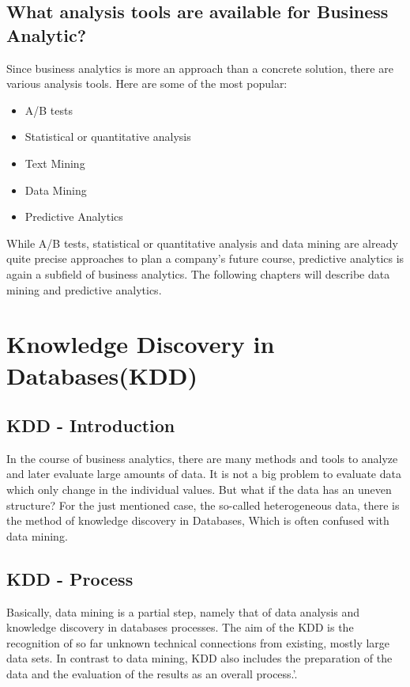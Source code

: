 \documentclass[12pt,twocolumn,twoside]{conference}   %
\begin{document}
\subsection{What analysis tools are available for Business Analytic?}
Since business analytics is more an approach than a concrete solution, there are various analysis tools. Here are some of the most popular:

\begin{itemize}
\item A/B tests
\item Statistical or quantitative analysis
\item Text Mining
\item Data Mining
\item Predictive Analytics
\end{itemize}

While A/B tests, statistical or quantitative analysis and data mining are already quite precise approaches to plan a company's future course, predictive analytics is again a subfield of business analytics. The following chapters will describe data mining and predictive analytics.

\section{Knowledge Discovery in Databases(KDD) }
\subsection{KDD - Introduction}
In the course of business analytics, there are many methods and tools to analyze and later evaluate large amounts of data. It is not a big problem to evaluate data which only change in the individual values. But what if the data has an uneven structure? For the just mentioned case, the so-called heterogeneous data, there is the method of knowledge discovery in Databases, Which is often confused with data mining. 

\subsection{KDD - Process}
Basically, data mining is a partial step, namely that of data analysis and knowledge discovery in databases processes. The aim of the KDD is the recognition of so far unknown technical connections from existing, mostly large data sets. In contrast to data mining, KDD also includes the preparation of the data and the evaluation of the results as an overall process.'. \cite{Beispiel:2016}
\end{document}
